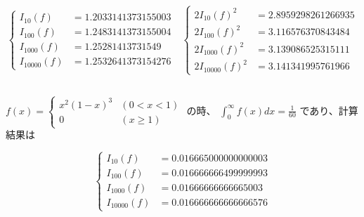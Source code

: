 \documentclass{jsarticle}
\begin{document}
\[
\left\{
	\begin{alignedat}{2}
		I_{10}(f) &= 1.2033141373155003\\
		I_{100}(f) &= 1.2483141373155004\\
		I_{1000}(f) &= 1.25281413731549\\
		I_{10000}(f) &= 1.2532641373154276
	\end{alignedat}
\right.
\,\,\,\,
\left\{
	\begin{alignedat}{2}
		2 I_{10}(f)^2 &= 2.8959298261266935\\
		2 I_{100}(f)^2 &= 3.116576370843484\\
		2 I_{1000}(f)^2 &= 3.139086525315111\\
		2 I_{10000}(f)^2 &= 3.141341995761966
	\end{alignedat}
\right.
\]


\subsection{}
$
f(x) = 
  \left\{
    \begin{array}{ll}
      x^2 (1-x)^3 &(0<x<1)\\
      0 &(x\geq1)
    \end{array}
  \right.
$
の時、
$\displaystyle \int_{0}^{\infty} f(x) dx = \frac{1}{60}$
であり、計算結果は

\[
\left\{
	\begin{alignedat}{2}
		I_{10}(f) &= 0.016665000000000003\\
		I_{100}(f) &= 0.016666666499999993\\
		I_{1000}(f) &= 0.01666666666665003\\
		I_{10000}(f) &= 0.016666666666666576
	\end{alignedat}
\right.
\]
\\
\section{}
\end{document}
